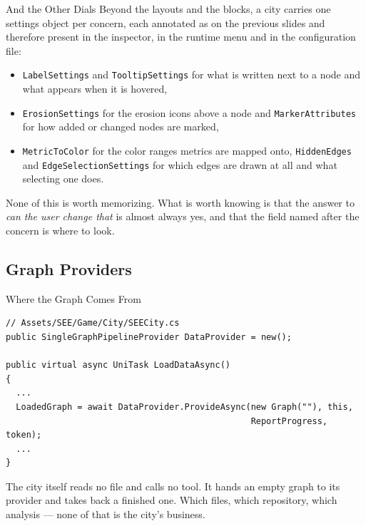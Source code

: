 \begin{frame}{And the Other Dials}
  Beyond the layouts and the blocks, a city carries one settings object per
  concern, each annotated as on the previous slides and therefore present in
  the inspector, in the runtime menu and in the configuration file:
  \begin{itemize}
    \item \texttt{LabelSettings} and \texttt{TooltipSettings} for what is
      written next to a node and what appears when it is hovered,
    \item \texttt{ErosionSettings} for the erosion icons above a node and
      \texttt{MarkerAttributes} for how added or changed nodes are marked,
    \item \texttt{MetricToColor} for the color ranges metrics are mapped onto,
      \texttt{HiddenEdges} and \texttt{EdgeSelectionSettings} for which edges
      are drawn at all and what selecting one does.
  \end{itemize}
  \vspace{1ex}

  None of this is worth memorizing. What is worth knowing is that the answer to
  \emph{can the user change that} is almost always yes, and that the field
  named after the concern is where to look.
\end{frame}

\subsection{Graph Providers}

\begin{frame}[fragile]{Where the Graph Comes From}
  \begin{lstlisting}[basicstyle=\scriptsize\ttfamily]
// Assets/SEE/Game/City/SEECity.cs
public SingleGraphPipelineProvider DataProvider = new();

public virtual async UniTask LoadDataAsync()
{
  ...
  LoadedGraph = await DataProvider.ProvideAsync(new Graph(""), this,
                                                ReportProgress, token);
  ...
}
  \end{lstlisting}
  \vspace{1ex}

  The city itself reads no file and calls no tool. It hands an empty graph to
  its provider and takes back a finished one. Which files, which repository,
  which analysis --- none of that is the city's business.
\end{frame}

